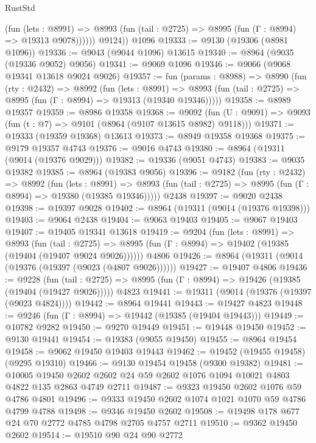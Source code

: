 \begin{lexlean}{RustStd}
\begin{coremodule}
              (fun (lets : @8991) =>
              @8993 (fun (tail : @2725) => @8995 (fun (Γ : @8994) => @19313 @9078))))))
        @9124))
    @1096
@19333 := @9130 (@19306 (@8981 @1096))
@19336 := @9043 (@9044 @1096) @13615
@19340 := @8964 (@9035 (@19336 @9052) @9056)
@19341 := @9069 @1096
@19346 := @9066 (@9068 @19341 @13618 @9024 @9026)
@19357 := fun (params : @8988) =>
  @8990
    (fun (rty : @2432) =>
    @8992
      (fun (lets : @8991) =>
      @8993 (fun (tail : @2725) => @8995 (fun (Γ : @8994) => @19313 (@19340 @19346)))))
@19358 := @8989 @19357
@19359 := @8986 @19358
@19368 := @9092
    (fun (U : @9091) => @9093 (fun (t : @7) => @9101 (@8964 (@9107 @13615 @8982) @9118)))
@19371 := @19333 (@19359 @19368) @13613
@19373 := @8949 @19358 @19368
@19375 := @9179 @19357 @4743
@19376 := @9016 @4743
@19380 := @8964 (@19311 (@9014 (@19376 @9029)))
@19382 := @19336 (@9051 @4743)
@19383 := @9035 @19382
@19385 := @8964 (@19383 @9056)
@19396 := @9182
    (fun (rty : @2432) =>
    @8992
      (fun (lets : @8991) =>
      @8993 (fun (tail : @2725) => @8995 (fun (Γ : @8994) => @19380 (@19385 @19346)))))
    @2438
@19397 := @9020 @2438
@19398 := @19397 @9028
@19402 := @8964 (@19311 (@9014 (@19376 @19398)))
@19403 := @9064 @2438
@19404 := @9063 @19403
@19405 := @9067 @19403
@19407 := @19405 @19341 @13618
@19419 := @9204
    (fun (lets : @8991) =>
    @8993
      (fun (tail : @2725) =>
      @8995 (fun (Γ : @8994) => @19402 (@19385 (@19404 (@19407 @9024 @9026))))))
    @4806
@19426 := @8964 (@19311 (@9014 (@19376 (@19397 (@9023 (@4807 @9026))))))
@19427 := @19407 @4806
@19436 := @9228
    (fun (tail : @2725) => @8995 (fun (Γ : @8994) => @19426 (@19385 (@19404 (@19427 @9026)))))
    @4823
@19441 := @19311 (@9014 (@19376 (@19397 (@9023 @4824))))
@19442 := @8964 @19441
@19443 := @19427 @4823
@19448 := @9246 (fun (Γ : @8994) => @19442 (@19385 (@19404 @19443)))
@19449 := @10782 @9282
@19450 := @9270 @19449
@19451 := @19448 @19450
@19452 := @9130 @19441
@19454 := @19383 (@9055 @19450)
@19455 := @8964 @19454
@19458 := @9062 @19450 @19403 @19443
@19462 := @19452 (@19455 @19458) (@9295 @19310)
@19466 := @9130 @19454 @19458 (@9300 @19382)
@19481 := @10005
    @19450
    @2602
    @2602
    @24
    @59
    @2602
    @1076
    @1094
    @10021
    @4803
    @4822
    @135
    @2863
    @4749
    @2711
@19487 := @9323 @19450 @2602 @1076 @59 @4786 @4801
@19496 := @9333 @19450 @2602 @1074 @1021 @1070 @59 @4786 @4799 @4788
@19498 := @9346 @19450 @2602
@19508 := @19498 @178 @677 @24 @70 @2772 @4785 @4798 @2705 @4757 @2711
@19510 := @9362 @19450 @2602
@19514 := @19510 @90 @24 @90 @2772

\end{coremodule}
\end{lexlean}
